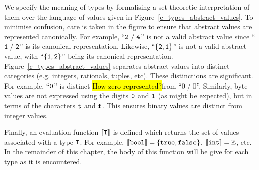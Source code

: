 We specify the meaning of types by formalising a set theoretic interpretation of them over the language of values given in Figure~\ref{c_types_abstract_values}.  To minimise confusion, care is taken in the figure to ensure that abstract values are represented canonically.  For example, ``${\tt 2\;/\;4}$'' is not a valid abstract value since ``${\tt 1\;/\;2}$'' is its canonical representation. Likewise, ``${\tt\{2,1\}}$'' is not a valid abstract value, with ``${\tt\{1,2\}}$'' being its canonical representation.   Figure~\ref{c_types_abstract_values} separates abstract values into distinct categories (e.g. integers, rationals, tuples, etc).  These distinctions are significant.  For example, ``${\tt 0}$'' is distinct \hl{How zero represented?}{from} ``${0\;/\;0}$''.  Similarly, byte values are not expressed using the digits ${\tt 0}$ and ${\tt 1}$ (as might be expected), but in terms of the characters ${\tt t}$ and ${\tt f}$.  This ensures binary values are distinct from integer values.

Finally, an evaluation function ${\tt\llbracket T\rrbracket}$ is defined which returns the set of values associated with a type ${\tt T}$.  For example, ${\tt\llbracket bool\rrbracket=\{true,false\}}$, ${\tt\llbracket int\rrbracket=\mathbb{Z}}$, etc.  In the remainder of this chapter, the body of this function will be give for each type as it is encountered.

